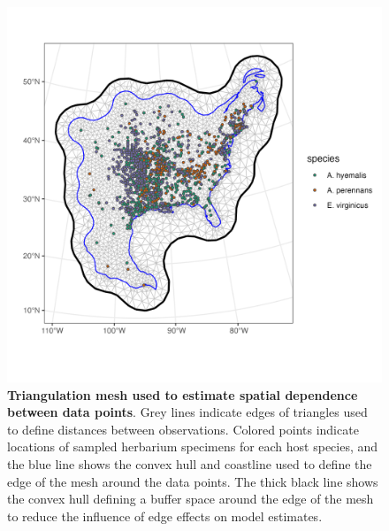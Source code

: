 \documentclass[11pt]{article}
\begin{document}
	\begin{figure}[H]
		\centering
		\includegraphics[width = \linewidth]{../Plots/mesh_plot.png}
		\caption[Triangulation mesh used to estimate spatial dependence between data points]{\textbf{Triangulation mesh used to estimate spatial dependence between data points}. Grey lines indicate edges of triangles used to define distances between observations. Colored points indicate locations of sampled herbarium specimens for each host species, and the blue line shows the convex hull and coastline used to define the edge of the mesh around the data points. The thick black line shows the convex hull defining a buffer space around the edge of the mesh to reduce the influence of edge effects on model estimates.}
		\label{fig:meshplot}
	\end{figure}
\end{document}

